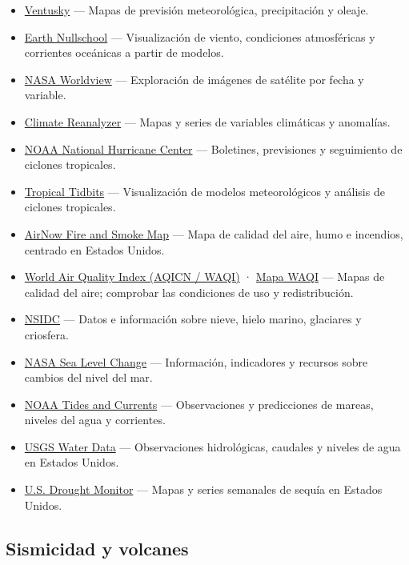 \documentclass[
  letterpaper,
  DIV=11,
  numbers=noendperiod]{scrartcl}
\providecommand{\tightlist}{%
  \setlength{\itemsep}{0pt}\setlength{\parskip}{0pt}}
\begin{document}
\begin{itemize}
\tightlist
\item
  \href{https://ventusky.com/}{Ventusky} --- Mapas de previsión
  meteorológica, precipitación y oleaje.
\item
  \href{https://earth.nullschool.net/}{Earth Nullschool} ---
  Visualización de viento, condiciones atmosféricas y corrientes
  oceánicas a partir de modelos.
\item
  \href{https://worldview.earthdata.nasa.gov/}{NASA Worldview} ---
  Exploración de imágenes de satélite por fecha y variable.
\item
  \href{https://climatereanalyzer.org/}{Climate Reanalyzer} --- Mapas y
  series de variables climáticas y anomalías.
\item
  \href{https://nhc.noaa.gov/}{NOAA National Hurricane Center} ---
  Boletines, previsiones y seguimiento de ciclones tropicales.
\item
  \href{https://tropicaltidbits.com/}{Tropical Tidbits} ---
  Visualización de modelos meteorológicos y análisis de ciclones
  tropicales.
\item
  \href{https://fire.airnow.gov/}{AirNow Fire and Smoke Map} --- Mapa de
  calidad del aire, humo e incendios, centrado en Estados Unidos.
\item
  \href{https://aqicn.org/}{World Air Quality Index (AQICN / WAQI)} ·
  \href{https://waqi.info/}{Mapa WAQI} --- Mapas de calidad del aire;
  comprobar las condiciones de uso y redistribución.
\item
  \href{https://nsidc.org/}{NSIDC} --- Datos e información sobre nieve,
  hielo marino, glaciares y criosfera.
\item
  \href{https://sealevel.nasa.gov/}{NASA Sea Level Change} ---
  Información, indicadores y recursos sobre cambios del nivel del mar.
\item
  \href{https://tidesandcurrents.noaa.gov/}{NOAA Tides and Currents} ---
  Observaciones y predicciones de mareas, niveles del agua y corrientes.
\item
  \href{https://waterdata.usgs.gov/}{USGS Water Data} --- Observaciones
  hidrológicas, caudales y niveles de agua en Estados Unidos.
\item
  \href{https://droughtmonitor.unl.edu/}{U.S. Drought Monitor} --- Mapas
  y series semanales de sequía en Estados Unidos.
\end{itemize}

\subsection{Sismicidad y volcanes}\label{sismicidad-y-volcanes}
\end{document}
